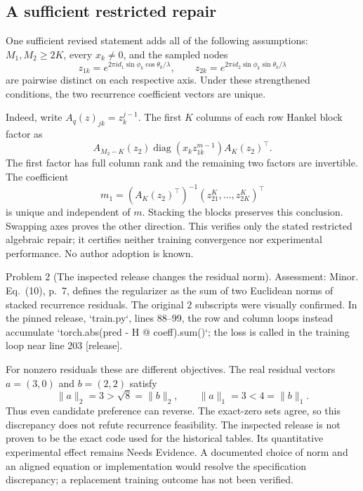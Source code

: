 \documentclass[10pt]{article}
\begin{document}
\subsection*{A sufficient restricted repair}
One sufficient revised statement adds all of the following assumptions: \(M_1,M_2\geq2K\), every \(x_k\ne0\), and the sampled nodes \[z_{1k}=e^{2\pi i d_1\sin\phi_k\cos\theta_k/\lambda},
\qquad
z_{2k}=e^{2\pi i d_2\sin\phi_k\sin\theta_k/\lambda}\] are pairwise distinct on each respective axis. Under these strengthened conditions, the two recurrence coefficient vectors are unique.\par
Indeed, write \(A_q(z)_{jk}=z_k^{j-1}\). The first \(K\) columns of each row Hankel block factor as \[A_{M_2-K}(z_2)
\operatorname{diag}(x_k z_{1k}^{m-1}) A_K(z_2)^\top.\] The first factor has full column rank and the remaining two factors are invertible. The coefficient \[m_1=(A_K(z_2)^\top)^{-1}(z_{21}^{K},\ldots,z_{2K}^{K})^\top\] is unique and independent of \(m\). Stacking the blocks preserves this conclusion. Swapping axes proves the other direction. This verifies only the stated restricted algebraic repair; it certifies neither training convergence nor experimental performance. No author adoption is known.\par
Problem 2 (The inspected release changes the residual norm).  Assessment: Minor. Eq. (10), p. 7, defines the regularizer as the sum of two Euclidean norms of stacked recurrence residuals. The original \(2\) subscripts were visually confirmed. In the pinned release, `train.py`, lines 88–99, the row and column loops instead accumulate `torch.abs(pred - H @ coeff).sum()`; the loss is called in the training loop near line 203 [release].\par
For nonzero residuals these are different objectives. The real residual vectors \(a=(3,0)\) and \(b=(2,2)\) satisfy \[\|a\|_2=3>\sqrt8=\|b\|_2,
\qquad
\|a\|_1=3<4=\|b\|_1.\] Thus even candidate preference can reverse. The exact-zero sets agree, so this discrepancy does not refute recurrence feasibility. The inspected release is not proven to be the exact code used for the historical tables. Its quantitative experimental effect remains Needs Evidence. A documented choice of norm and an aligned equation or implementation would resolve the specification discrepancy; a replacement training outcome has not been verified.\par
\end{document}
